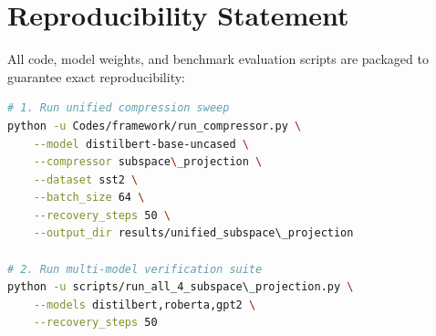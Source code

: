 \section{Reproducibility Statement}
All code, model weights, and benchmark evaluation scripts are packaged to guarantee exact reproducibility:
\begin{lstlisting}[language=bash]
# 1. Run unified compression sweep
python -u Codes/framework/run_compressor.py \
    --model distilbert-base-uncased \
    --compressor subspace\_projection \
    --dataset sst2 \
    --batch_size 64 \
    --recovery_steps 50 \
    --output_dir results/unified_subspace\_projection

# 2. Run multi-model verification suite
python -u scripts/run_all_4_subspace\_projection.py \
    --models distilbert,roberta,gpt2 \
    --recovery_steps 50
\end{lstlisting}
